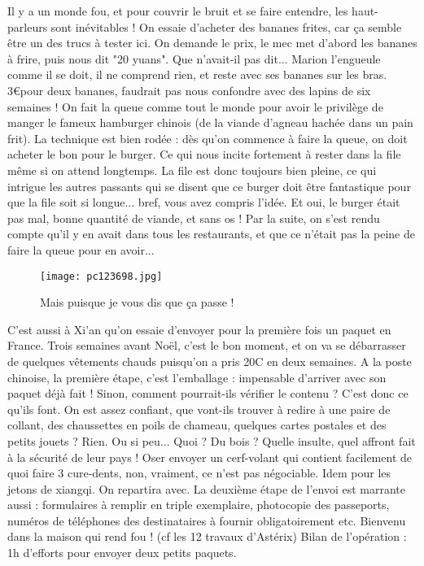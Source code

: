 \documentclass{book}
\begin{document}
Il y a un monde fou, et pour couvrir le bruit et se faire entendre, les haut-parleurs sont inévitables ! On essaie d'acheter des bananes frites, car ça semble être un des trucs à tester ici. On demande le prix, le mec met d'abord les bananes à frire, puis nous dit "20 yuans". Que n'avait-il pas dit... Marion l'engueule comme il se doit, il ne comprend rien, et reste avec ses bananes sur les bras. 3\euro pour deux bananes, faudrait pas nous confondre avec des lapins de six semaines ! On fait la queue comme tout le monde pour avoir le privilège de manger le fameux hamburger chinois (de la viande d'agneau hachée dans un pain frit). La technique est bien rodée : dès qu'on commence à faire la queue, on doit acheter le bon pour le burger. Ce qui nous incite fortement à rester dans la file même si on attend longtemps. La file est donc toujours bien pleine, ce qui intrigue les autres passants qui se disent que ce burger doit être fantastique pour que la file soit si longue... bref, vous avez compris l'idée. Et oui, le burger était pas mal, bonne quantité de viande, et sans os ! Par la suite, on s'est rendu compte qu'il y en avait dans tous les restaurants, et que ce n'était pas la peine de faire la queue pour en avoir...


\begin{figure}[h]
\centering
\texttt{[image: pc123698.jpg]}
\caption*{Mais puisque je vous dis que ça passe !}
\end{figure}

C'est aussi à Xi'an qu'on essaie d'envoyer pour la première fois un paquet en France. Trois semaines avant Noël, c'est le bon moment, et on va se débarrasser de quelques vêtements chauds puisqu'on a pris 20\textdegree C en deux semaines. A la poste chinoise, la première étape, c'est l'emballage : impensable d'arriver avec son paquet déjà fait ! Sinon, comment pourrait-ils vérifier le contenu ? C'est donc ce qu'ils font. On est assez confiant, que vont-ils trouver à redire à une paire de collant, des chaussettes en poils de chameau, quelques cartes postales et des petits jouets ? Rien. Ou si peu... Quoi ? Du bois ? Quelle insulte, quel affront fait à la sécurité de leur pays ! Oser envoyer un cerf-volant qui contient facilement de quoi faire 3 cure-dents, non, vraiment, ce n'est pas négociable. Idem pour les jetons de xiangqi. On repartira avec. La deuxième étape de l'envoi est marrante aussi : formulaires à remplir en triple exemplaire, photocopie des passeports, numéros de téléphones des destinataires à fournir obligatoirement etc. Bienvenu dans la maison qui rend fou ! (cf les 12 travaux d'Astérix) Bilan de l'opération : 1h d'efforts pour envoyer deux petits paquets.
\end{document}
